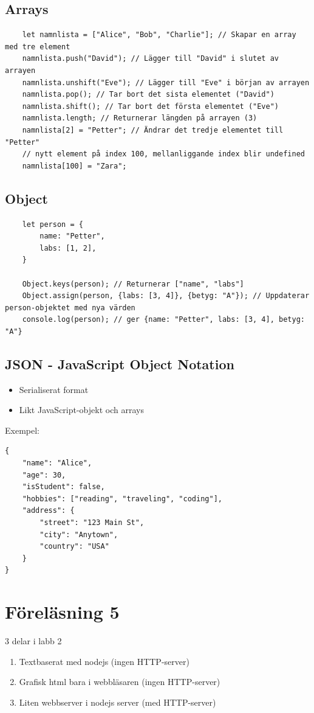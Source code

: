 \documentclass[12pt,a4paper]{article}
\begin{document}
\subsection{Arrays}
\begin{verbatim}
    let namnlista = ["Alice", "Bob", "Charlie"]; // Skapar en array med tre element
    namnlista.push("David"); // Lägger till "David" i slutet av arrayen
    namnlista.unshift("Eve"); // Lägger till "Eve" i början av arrayen
    namnlista.pop(); // Tar bort det sista elementet ("David")
    namnlista.shift(); // Tar bort det första elementet ("Eve")
    namnlista.length; // Returnerar längden på arrayen (3)
    namnlista[2] = "Petter"; // Ändrar det tredje elementet till "Petter"
    // nytt element på index 100, mellanliggande index blir undefined
    namnlista[100] = "Zara"; 
\end{verbatim}

\subsection{Object}
\begin{verbatim}
    let person = {
        name: "Petter",
        labs: [1, 2],
    }

    Object.keys(person); // Returnerar ["name", "labs"]
    Object.assign(person, {labs: [3, 4]}, {betyg: "A"}); // Uppdaterar person-objektet med nya värden
    console.log(person); // ger {name: "Petter", labs: [3, 4], betyg: "A"}
\end{verbatim}

\subsection{JSON - JavaScript Object Notation}
\begin{itemize}
    \item Serialiserat format 
    \item Likt JavaScript-objekt och arrays
\end{itemize}
Exempel:
\begin{verbatim}
{
    "name": "Alice",
    "age": 30,
    "isStudent": false,
    "hobbies": ["reading", "traveling", "coding"],
    "address": {
        "street": "123 Main St",
        "city": "Anytown",
        "country": "USA"
    }
}
\end{verbatim}

\section{Föreläsning 5}
3 delar i labb 2
\begin{enumerate}
    \item Textbaserat med nodejs (ingen HTTP-server)
    \item Grafisk html bara i webbläsaren (ingen HTTP-server)
    \item Liten webbserver i nodejs server (med HTTP-server)
\end{enumerate}
\end{document}
